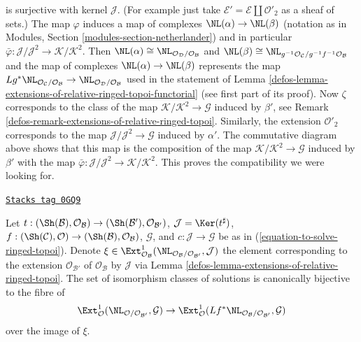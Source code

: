 \begin{remark}
is surjective with kernel $\mathcal{J}$. (For example just take
$\mathcal{E}' = \mathcal{E} \amalg \mathcal{O}'_2$ as a sheaf of sets.)
The map $\varphi$ induces a map of complexes $\NL(\alpha) \to \NL(\beta)$
(notation as in Modules, Section \ref{modules-section-netherlander})
and in particular
$\bar\varphi : \mathcal{J}/\mathcal{J}^2 \to \mathcal{K}/\mathcal{K}^2$.
Then $\NL(\alpha) \cong \NL_{\mathcal{O}_\mathcal{D}/\mathcal{O}_\mathcal{B}}$
and
$\NL(\beta) \cong
\NL_{g^{-1}\mathcal{O}_\mathcal{C}/g^{-1}f^{-1}\mathcal{O}_\mathcal{B}}$
and the map of complexes $\NL(\alpha) \to \NL(\beta)$
represents the map
$Lg^*\NL_{\mathcal{O}_\mathcal{C}/\mathcal{O}_\mathcal{B}} \to
\NL_{\mathcal{O}_\mathcal{D}/\mathcal{O}_\mathcal{B}}$
used in the
statement of Lemma \ref{defos-lemma-extensions-of-relative-ringed-topoi-functorial}
(see first part of its proof). Now $\zeta$ corresponds to the
class of the map $\mathcal{K}/\mathcal{K}^2 \to \mathcal{G}$
induced by $\beta'$, see
Remark \ref{defos-remark-extensions-of-relative-ringed-topoi}.
Similarly, the extension $\mathcal{O}'_2$ corresponds to the map
$\mathcal{J}/\mathcal{J}^2 \to \mathcal{G}$ induced by $\alpha'$.
The commutative diagram above shows that this map is
the composition of the map $\mathcal{K}/\mathcal{K}^2 \to \mathcal{G}$
induced by $\beta'$ with the map
$\bar\varphi : \mathcal{J}/\mathcal{J}^2 \to \mathcal{K}/\mathcal{K}^2$.
This proves the compatibility we were looking for.
\end{remark}

\begin{lemma}
\label{defos-lemma-parametrize-solutions-ringed-topoi}
\href{https://stacks.math.columbia.edu/tag/0GQ9}{\texttt{Stacks tag 0GQ9}}

Let $t : (\Sh(\mathcal{B}), \mathcal{O}_\mathcal{B}) \to
(\Sh(\mathcal{B}'), \mathcal{O}_{\mathcal{B}'})$,
$\mathcal{J} = \Ker(t^\sharp)$,
$f : (\Sh(\mathcal{C}), \mathcal{O}) \to
(\Sh(\mathcal{B}), \mathcal{O}_\mathcal{B})$, $\mathcal{G}$, and
$c : \mathcal{J} \to \mathcal{G}$ be as in
(\ref{equation-to-solve-ringed-topoi}).
Denote $\xi \in \Ext^1_{\mathcal{O}_\mathcal{B}}(
\NL_{\mathcal{O}_\mathcal{B}/\mathcal{O}_{\mathcal{B}'}}, \mathcal{J})$
the element corresponding to the extension $\mathcal{O}_{\mathcal{B}'}$
of $\mathcal{O}_\mathcal{B}$ by $\mathcal{J}$ via
Lemma \ref{defos-lemma-extensions-of-relative-ringed-topoi}.
The set of isomorphism classes of solutions is canonically bijective
to the fibre of
$$
\Ext^1_\mathcal{O}(\NL_{\mathcal{O}/\mathcal{O}_{\mathcal{B}'}},
\mathcal{G})\to
\Ext^1_\mathcal{O}(
Lf^*\NL_{\mathcal{O}_\mathcal{B}/\mathcal{O}_{\mathcal{B}'}}, \mathcal{G})
$$
over the image of $\xi$.
\end{lemma}

